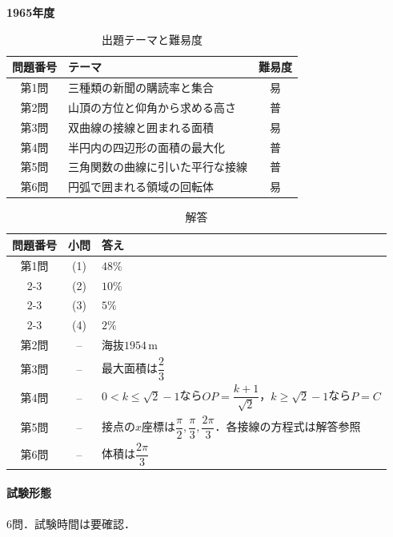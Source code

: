 \documentclass[../../main.tex]{subfiles}
\begin{document}
\begin{center}
  {\fontsize{48pt}{58pt}\selectfont \textbf{1965}\normalsize\textbf{年度}}
\end{center}

\begin{table}[htb]
  \centering
  \caption{出題テーマと難易度}
  \begin{tabular}{|c|p{9cm}|c|}
    \hline
    \textbf{問題番号} & \textbf{テーマ} & \textbf{難易度} \\
    \hline
    第1問 & 三種類の新聞の購読率と集合 & 易 \\
    \hline
    第2問 & 山頂の方位と仰角から求める高さ & 普 \\
    \hline
    第3問 & 双曲線の接線と囲まれる面積 & 易 \\
    \hline
    第4問 & 半円内の四辺形の面積の最大化 & 普 \\
    \hline
    第5問 & 三角関数の曲線に引いた平行な接線 & 普 \\
    \hline
    第6問 & 円弧で囲まれる領域の回転体 & 易 \\
    \hline
  \end{tabular}
\end{table}

\begin{table}[htb]
  \centering
  \caption{解答}
  \renewcommand{\arraystretch}{1.4}
  \begin{tabular}{|c|c|p{9cm}|}
    \hline
    \textbf{問題番号} & \textbf{小問} & \textbf{答え} \\
    \hline
    第1問 & (1) & $48\%$ \\
    \cline{2-3}
    & (2) & $10\%$ \\
    \cline{2-3}
    & (3) & $5\%$ \\
    \cline{2-3}
    & (4) & $2\%$ \\
    \hline
    第2問 & -- & 海抜$1954\,\mathrm{m}$ \\
    \hline
    第3問 & -- & 最大面積は$\dfrac{2}{3}$ \\
    \hline
    第4問 & -- & $0<k\le\sqrt{2}-1$なら$OP=\dfrac{k+1}{\sqrt{2}}$，$k\ge\sqrt{2}-1$なら$P=C$ \\
    \hline
    第5問 & -- & 接点の$x$座標は$\dfrac{\pi}{2},\dfrac{\pi}{3},\dfrac{2\pi}{3}$．各接線の方程式は解答参照 \\
    \hline
    第6問 & -- & 体積は$\dfrac{2\pi}{3}$ \\
    \hline
  \end{tabular}
\end{table}

\paragraph{試験形態}
6問．試験時間は要確認．
\end{document}
